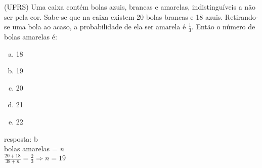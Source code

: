 \begin{ex}
 (UFRS) Uma caixa contém bolas azuis, brancas e amarelas, indistinguíveis a não ser pela cor. Sabe-se que na caixa existem 20 bolas brancas e 18 azuis. Retirando-se uma bola ao acaso, a probabilidade de ela ser amarela é $\frac{1}{3}$. Então o número de bolas amarelas é:
    \begin{enumerate}[(a)]
    \item 18
    \item 19
    \item 20
    \item 21
    \item 22
    \end{enumerate}
      \begin{sol}
      resposta: b  \\
      bolas amarelas = \textit{n} \\
      $\frac{20+18}{38+n}=\frac{2}{3} \Longrightarrow n=19$
      \end{sol}
\end{ex}